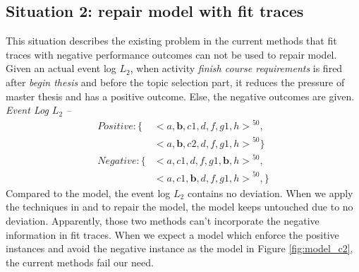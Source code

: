 \subsection{Situation 2: \small{repair model with fit traces}}
This situation describes the existing problem in the current methods that fit traces with negative performance outcomes can not be used to repair model. Given an actual event log $L_2$, when activity \emph{finish course requirements} is fired after \emph{begin thesis} and before the topic selection part, it reduces the pressure of master thesis and has a positive outcome. Else, the negative outcomes are given. 
\emph{Event Log $L_2$ -- }
\begin{align*}
Positive:\{ & { <a,\textbf{b},c1,d,f,g1,h>}^{50}, \\   &{<a,\textbf{b},c2,d,f,g1,h>}^{50} \}  \\
Negative: \{ & {<a,c1,d,f,g1,\textbf{b},h>}^{50}, \\
& {<a,c1,\textbf{b},d,f,g1,h>}^{50},  \}
\end{align*}
Compared to the model, the event log $L_2$ contains no deviation. When we apply the techniques in \cite{fahland2015model} and \cite{dees2017enhancing} to repair the model, the model keeps untouched due to no deviation. Apparently, those two methods can't incorporate the negative information in fit traces. When we expect a model which enforce the positive instances and avoid the negative instance as the model in Figure \ref{fig:model_c2}, the current methods fail our need. 
